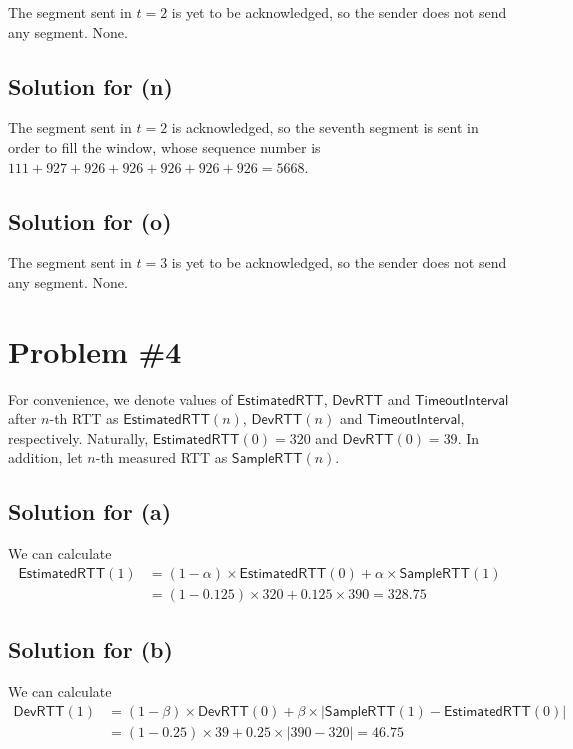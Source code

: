 \documentclass{scrartcl}
\begin{document}
The segment sent in \(t = 2\) is yet to be acknowledged, so the sender does not
send any segment. None.

\subsection{Solution for (n)}

The segment sent in \(t = 2\) is acknowledged, so the seventh segment is sent in
order to fill the window, whose sequence number is \(111 + 927 + 926 + 926 + 926
+ 926 + 926 = 5668\).

\subsection{Solution for (o)}

The segment sent in \(t = 3\) is yet to be acknowledged, so the sender does not
send any segment. None.

\section{Problem \#4}

For convenience, we denote values of \(\mathsf{EstimatedRTT}\),
\(\mathsf{DevRTT}\) and \(\mathsf{TimeoutInterval}\) after \(n\)-th
RTT as \(\mathsf{EstimatedRTT}(n)\), \(\mathsf{DevRTT}(n)\) and
\(\mathsf{TimeoutInterval}\), respectively. Naturally, \(\mathsf{EstimatedRTT}
(0) = 320\) and \(\mathsf{DevRTT}(0) = 39\). In addition, let \(n\)-th measured
RTT as \(\mathsf{SampleRTT}(n)\).

\subsection{Solution for (a)}

We can calculate
\begin{align*}
\mathsf{EstimatedRTT}(1)
&= (1 - \alpha) \times \mathsf{EstimatedRTT}(0) + \alpha \times
\mathsf{SampleRTT}(1) \\
&= (1 - 0.125) \times 320 + 0.125 \times 390
= 328.75
\end{align*}

\subsection{Solution for (b)}

We can calculate
\begin{align*}
\mathsf{DevRTT}(1)
&= (1 - \beta) \times \mathsf{DevRTT}(0) + \beta \times |\mathsf{SampleRTT}(1) -
\mathsf{EstimatedRTT}(0)| \\
&= (1 - 0.25) \times 39 + 0.25 \times |390 - 320|
= 46.75
\end{align*}
\end{document}
